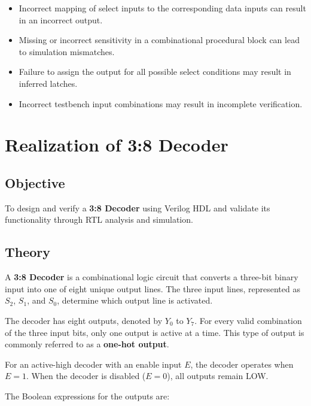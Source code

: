 \documentclass[12pt,a4paper]{report}
\begin{document}
\begin{itemize}
    \item Incorrect mapping of select inputs to the corresponding data inputs can result in an incorrect output.
    
    \item Missing or incorrect sensitivity in a combinational procedural block can lead to simulation mismatches.
    
    \item Failure to assign the output for all possible select conditions may result in inferred latches.
    
    \item Incorrect testbench input combinations may result in incomplete verification.
\end{itemize}

\chapter{Realization of 3:8 Decoder}
\label{ch:exp6}

\section{Objective}

To design and verify a \textbf{3:8 Decoder} using Verilog HDL and validate its functionality through RTL analysis and simulation.

\section{Theory}

A \textbf{3:8 Decoder} is a combinational logic circuit that converts a three-bit binary input into one of eight unique output lines. The three input lines, represented as $S_2$, $S_1$, and $S_0$, determine which output line is activated.

The decoder has eight outputs, denoted by $Y_0$ to $Y_7$. For every valid combination of the three input bits, only one output is active at a time. This type of output is commonly referred to as a \textbf{one-hot output}.

For an active-high decoder with an enable input $E$, the decoder operates when $E = 1$. When the decoder is disabled ($E = 0$), all outputs remain LOW.

The Boolean expressions for the outputs are:
\end{document}
